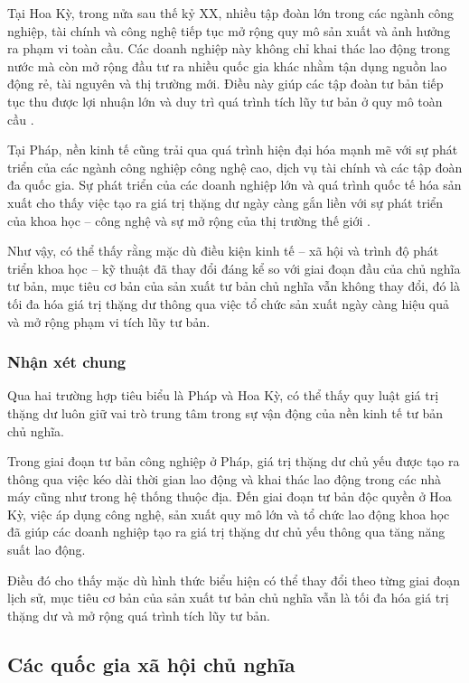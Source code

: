 Tại Hoa Kỳ, trong nửa sau thế kỷ XX, nhiều tập đoàn lớn trong các ngành công nghiệp, tài chính và công nghệ tiếp tục mở rộng quy mô sản xuất và ảnh hưởng ra phạm vi toàn cầu. Các doanh nghiệp này không chỉ khai thác lao động trong nước mà còn mở rộng đầu tư ra nhiều quốc gia khác nhằm tận dụng nguồn lao động rẻ, tài nguyên và thị trường mới. Điều này giúp các tập đoàn tư bản tiếp tục thu được lợi nhuận lớn và duy trì quá trình tích lũy tư bản ở quy mô toàn cầu \cite{LeninImperial}.

Tại Pháp, nền kinh tế cũng trải qua quá trình hiện đại hóa mạnh mẽ với sự phát triển của các ngành công nghiệp công nghệ cao, dịch vụ tài chính và các tập đoàn đa quốc gia. Sự phát triển của các doanh nghiệp lớn và quá trình quốc tế hóa sản xuất cho thấy việc tạo ra giá trị thặng dư ngày càng gắn liền với sự phát triển của khoa học – công nghệ và sự mở rộng của thị trường thế giới \cite{lichsu}.

Như vậy, có thể thấy rằng mặc dù điều kiện kinh tế – xã hội và trình độ phát triển khoa học – kỹ thuật đã thay đổi đáng kể so với giai đoạn đầu của chủ nghĩa tư bản, mục tiêu cơ bản của sản xuất tư bản chủ nghĩa vẫn không thay đổi, đó là tối đa hóa giá trị thặng dư thông qua việc tổ chức sản xuất ngày càng hiệu quả và mở rộng phạm vi tích lũy tư bản.

\subsubsection{Nhận xét chung}

Qua hai trường hợp tiêu biểu là Pháp và Hoa Kỳ, có thể thấy quy luật giá trị thặng dư luôn giữ vai trò trung tâm trong sự vận động của nền kinh tế tư bản chủ nghĩa.

Trong giai đoạn tư bản công nghiệp ở Pháp, giá trị thặng dư chủ yếu được tạo ra thông qua việc kéo dài thời gian lao động và khai thác lao động trong các nhà máy cũng như trong hệ thống thuộc địa. Đến giai đoạn tư bản độc quyền ở Hoa Kỳ, việc áp dụng công nghệ, sản xuất quy mô lớn và tổ chức lao động khoa học đã giúp các doanh nghiệp tạo ra giá trị thặng dư chủ yếu thông qua tăng năng suất lao động.

Điều đó cho thấy mặc dù hình thức biểu hiện có thể thay đổi theo từng giai đoạn lịch sử, mục tiêu cơ bản của sản xuất tư bản chủ nghĩa vẫn là tối đa hóa giá trị thặng dư và mở rộng quá trình tích lũy tư bản.

\subsection{Các quốc gia xã hội chủ nghĩa}

